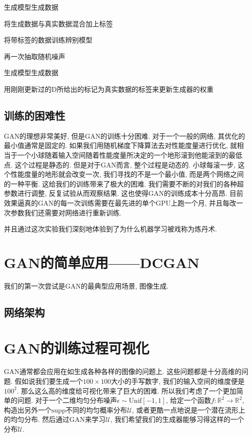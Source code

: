 \documentclass[lang=cn,11pt]{elegantpaper}
\begin{document}
生成模型生成数据

将生成数据与真实数据混合加上标签

将带标签的数据训练辨别模型

再一次抽取随机噪声

生成模型生成数据

用刚刚更新过的D所给出的标记为真实数据的标签来更新生成器的权重

\subsection{训练的困难性}

GAN的理想非常美好, 但是GAN的训练十分困难. 对于一个一般的网络, 其优化的最小值通常是固定的. 如果我们用随机梯度下降算法去对性能度量进行优化, 就相当于一个小球随着输入空间随着性能度量所决定的一个地形滚到他能滚到的最低点. 这个过程是静态的. 但是对于GAN而言, 整个过程是动态的. 小球每滚一步, 这个性能度量的地形就会改变一次, 我们寻找的不是一个最小值, 而是两个网络之间的一种平衡. 这给我们的训练带来了极大的困难. 我们需要不断的对我们的各种超参数进行调整, 反复试验从而观察结果. 这也使得GAN的训练成本十分高昂. 目前效果逼真的GAN的每一次训练需要在最先进的单个GPU上跑一个月, 并且每改一次参数我们还需要对网络进行重新训练. 

并且通过这次实验我们深刻地体验到了为什么机器学习被戏称为炼丹术. 


\section{GAN的简单应用——DCGAN}

我们的第一次尝试是GAN的最典型应用场景, 图像生成.

\subsection{网络架构}




\section{GAN的训练过程可视化}

GAN通常都会应用在如生成各种各样的图像的问题上. 这些问题都是十分高维的问题. 假如说我们要生成一个$100\times 100$大小的手写数字, 我们的输入空间的维度便是$100^2$. 那么这么高的维度给可视化带来了巨大的困难. 所以我们考虑了一个更加简单的问题. 对于一个二维均匀分布噪声$\epsilon \sim \mathrm{Unif}[-1,1]$, 给定一个函数$f:\mathbb R^2 \to \mathbb R^2$, 构造出另外一个$\mathrm{supp}$不同的均匀概率分布$\mathcal U$, 或者更酷一点地说是一个潜在流形上的均匀分布. 然后通过GAN来学习$\mathcal U$, 我们希望我们的生成器能够习得这样的一个分布$\mathcal U$.




\nocite{*}



\end{document}
